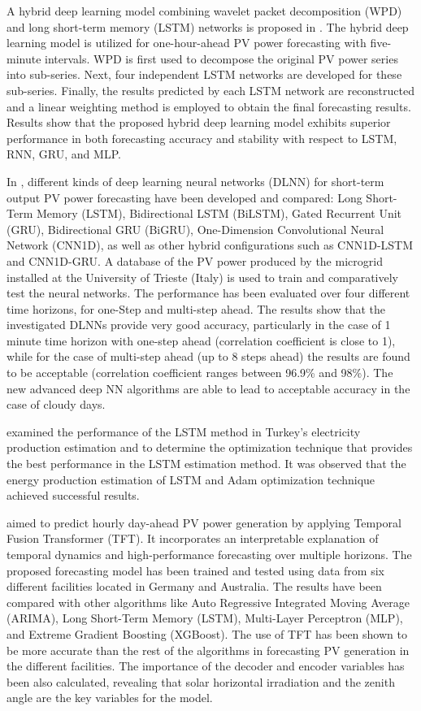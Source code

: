 A hybrid deep learning model combining wavelet packet decomposition (WPD) and long short-term memory (LSTM) networks is proposed in \cite{LI2020114216}.
The hybrid deep learning model is utilized for one-hour-ahead PV power forecasting with five-minute intervals.
WPD is first used to decompose the original PV power series into sub-series.
Next, four independent LSTM networks are developed for these sub-series.
Finally, the results predicted by each LSTM network are reconstructed and a linear weighting method is employed to obtain the final forecasting results.
Results show that the proposed hybrid deep learning model exhibits superior performance in both forecasting accuracy and stability with respect to LSTM, RNN, GRU, and MLP.

In \cite{MELLIT2021276}, different kinds of deep learning neural networks (DLNN) for short-term output PV power forecasting have been developed and compared: Long Short-Term Memory (LSTM), Bidirectional LSTM (BiLSTM), Gated Recurrent Unit (GRU), Bidirectional GRU (BiGRU), One-Dimension Convolutional Neural Network (CNN1D), as well as other hybrid configurations such as CNN1D-LSTM and CNN1D-GRU.
A database of the PV power produced by the microgrid installed at the University of Trieste (Italy) is used to train and comparatively test the neural networks.
The performance has been evaluated over four different time horizons, for one-Step and multi-step ahead.
The results show that the investigated DLNNs provide very good accuracy, particularly in the case of 1 minute time horizon with one-step ahead (correlation coefficient is close to 1), while for the case of multi-step ahead (up to 8 steps ahead) the results are found to be acceptable (correlation coefficient ranges between 96.9\% and 98\%).
The new advanced deep NN algorithms are able to lead to acceptable accuracy in the case of cloudy days.

\cite{9848724} examined the performance of the LSTM method in Turkey's electricity production estimation and to determine the optimization technique that provides the best performance in the LSTM estimation method.
It was observed that the energy production estimation of LSTM and Adam optimization technique achieved successful results. 

\cite{en15145232} aimed to predict hourly day-ahead PV power generation by applying Temporal Fusion Transformer (TFT).
It incorporates an interpretable explanation of temporal dynamics and high-performance forecasting over multiple horizons.
The proposed forecasting model has been trained and tested using data from six different facilities located in Germany and Australia.
The results have been compared with other algorithms like Auto Regressive Integrated Moving Average (ARIMA), Long Short-Term Memory (LSTM), Multi-Layer Perceptron (MLP), and Extreme Gradient Boosting (XGBoost).
The use of TFT has been shown to be more accurate than the rest of the algorithms in forecasting PV generation in the different facilities.
The importance of the decoder and encoder variables has been also calculated, revealing that solar horizontal irradiation and the zenith angle are the key variables for the model.

